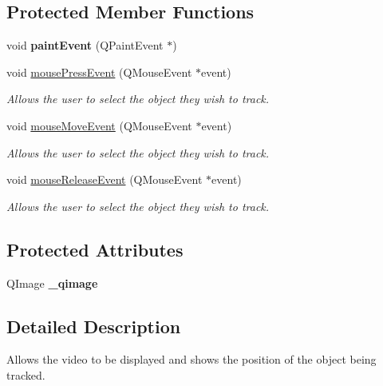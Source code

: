 \subsection*{Protected Member Functions}
\begin{DoxyCompactItemize}
\item 
\hypertarget{class_qt_widget_image_display_a04130803d15b2efd86e7dc7b943d6508}{}void {\bfseries paint\+Event} (Q\+Paint\+Event $\ast$)\label{class_qt_widget_image_display_a04130803d15b2efd86e7dc7b943d6508}

\item 
void \hyperlink{class_qt_widget_image_display_a6235f02715be56b1d0c79a0162b3b3f5}{mouse\+Press\+Event} (Q\+Mouse\+Event $\ast$event)
\begin{DoxyCompactList}\small\item\em Allows the user to select the object they wish to track. \end{DoxyCompactList}\item 
void \hyperlink{class_qt_widget_image_display_ac299992cba352e07584839bb5e407cae}{mouse\+Move\+Event} (Q\+Mouse\+Event $\ast$event)
\begin{DoxyCompactList}\small\item\em Allows the user to select the object they wish to track. \end{DoxyCompactList}\item 
void \hyperlink{class_qt_widget_image_display_a1436ddfbe1ea7b4f2eb58552d50d077e}{mouse\+Release\+Event} (Q\+Mouse\+Event $\ast$event)
\begin{DoxyCompactList}\small\item\em Allows the user to select the object they wish to track. \end{DoxyCompactList}\end{DoxyCompactItemize}
\subsection*{Protected Attributes}
\begin{DoxyCompactItemize}
\item 
\hypertarget{class_qt_widget_image_display_a2d153ae169f34e0cfa9d8b491e6ef579}{}Q\+Image {\bfseries \+\_\+qimage}\label{class_qt_widget_image_display_a2d153ae169f34e0cfa9d8b491e6ef579}

\end{DoxyCompactItemize}


\subsection{Detailed Description}
Allows the video to be displayed and shows the position of the object being tracked. 

